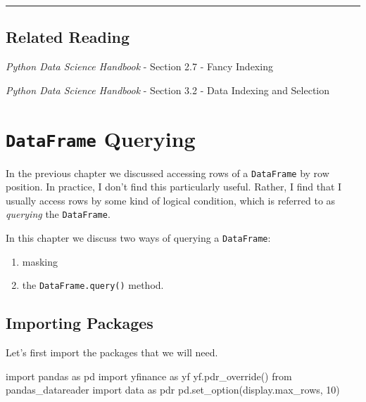 \documentclass[
  letterpaper,
  DIV=11,
  numbers=noendperiod]{scrreprt}
\newenvironment{Shaded}{\begin{snugshade}}{\end{snugshade}}
\newcommand{\DecValTok}[1]{\textcolor[rgb]{0.68,0.00,0.00}{#1}}
\newcommand{\ImportTok}[1]{\textcolor[rgb]{0.00,0.46,0.62}{#1}}
\newcommand{\NormalTok}[1]{\textcolor[rgb]{0.00,0.23,0.31}{#1}}
\newcommand{\StringTok}[1]{\textcolor[rgb]{0.13,0.47,0.30}{#1}}
\providecommand{\tightlist}{%
  \setlength{\itemsep}{0pt}\setlength{\parskip}{0pt}}\usepackage{longtable,booktabs,array}
\begin{document}
\begin{center}\rule{0.5\linewidth}{0.5pt}\end{center}

\hypertarget{related-reading-1}{%
\section{Related Reading}\label{related-reading-1}}

\emph{Python Data Science Handbook} - Section 2.7 - Fancy Indexing

\emph{Python Data Science Handbook} - Section 3.2 - Data Indexing and
Selection

\hypertarget{dataframe-querying}{%
\chapter{\texorpdfstring{\texttt{DataFrame}
Querying}{DataFrame Querying}}\label{dataframe-querying}}

In the previous chapter we discussed accessing rows of a
\texttt{DataFrame} by row position. In practice, I don't find this
particularly useful. Rather, I find that I usually access rows by some
kind of logical condition, which is referred to as \emph{querying} the
\texttt{DataFrame}.

In this chapter we discuss two ways of querying a \texttt{DataFrame}:

\begin{enumerate}
\def\labelenumi{\arabic{enumi}.}
\tightlist
\item
  masking
\item
  the \texttt{DataFrame.query()} method.
\end{enumerate}

\hypertarget{importing-packages-3}{%
\section{Importing Packages}\label{importing-packages-3}}

Let's first import the packages that we will need.

\begin{Shaded}
\begin{Highlighting}[]
\ImportTok{import}\NormalTok{ pandas }\ImportTok{as}\NormalTok{ pd}
\ImportTok{import}\NormalTok{ yfinance }\ImportTok{as}\NormalTok{ yf}
\NormalTok{yf.pdr\_override()}
\ImportTok{from}\NormalTok{ pandas\_datareader }\ImportTok{import}\NormalTok{ data }\ImportTok{as}\NormalTok{ pdr}
\NormalTok{pd.set\_option(}\StringTok{\textquotesingle{}display.max\_rows\textquotesingle{}}\NormalTok{, }\DecValTok{10}\NormalTok{)}
\end{Highlighting}
\end{Shaded}
\end{document}
